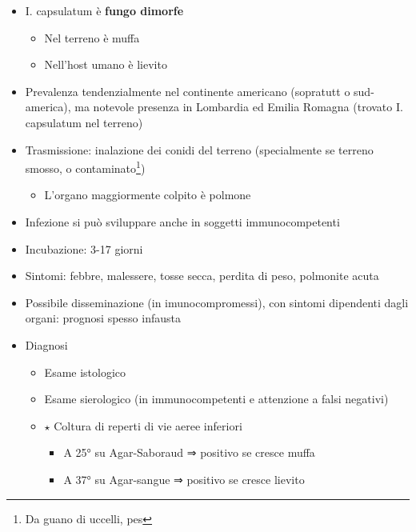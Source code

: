 \documentclass[italian,]{article}
\providecommand{\tightlist}{%
  \setlength{\itemsep}{0pt}\setlength{\parskip}{0pt}}
\newcommand{\goldstandard}{\textcircled{$\star$} }                      %
\begin{document}
\begin{itemize}
\tightlist
\item
  I. capsulatum è \textbf{fungo dimorfe}

  \begin{itemize}
  \tightlist
  \item
    Nel terreno è muffa
  \item
    Nell'host umano è lievito
  \end{itemize}
\item
  Prevalenza tendenzialmente nel continente americano (sopratutt o
  sud-america), ma notevole presenza in Lombardia ed Emilia Romagna
  (trovato I. capsulatum nel terreno)
\item
  Trasmissione: inalazione dei conidi del terreno (specialmente se
  terreno smosso, o contaminato\footnote{Da guano di uccelli, pes})

  \begin{itemize}
  \tightlist
  \item
    L'organo maggiormente colpito è polmone
  \end{itemize}
\item
  Infezione si può sviluppare anche in soggetti immunocompetenti
\item
  Incubazione: 3-17 giorni
\item
  Sintomi: febbre, malessere, tosse secca, perdita di peso, polmonite
  acuta
\item
  Possibile disseminazione (in imunocompromessi), con sintomi dipendenti
  dagli organi: prognosi spesso infausta
\item
  Diagnosi

  \begin{itemize}
  \tightlist
  \item
    Esame istologico
  \item
    Esame sierologico (in immunocompetenti e attenzione a falsi
    negativi)
  \item
    \goldstandard Coltura di reperti di vie aeree inferiori

    \begin{itemize}
    \tightlist
    \item
      A 25° su Agar-Saboraud ⇒ positivo se cresce muffa
    \item
      A 37° su Agar-sangue ⇒ positivo se cresce lievito
    \end{itemize}
  \end{itemize}
\end{itemize}
\end{document}
